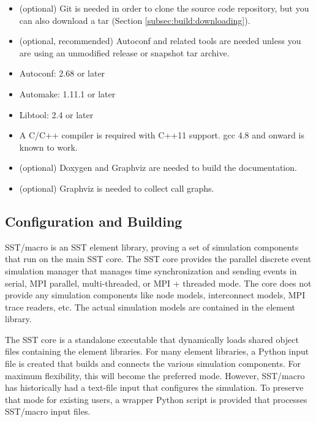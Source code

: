 \begin{itemize}
\item (optional) Git is needed in order to clone the source code repository, but you can also download a tar (Section \ref{subsec:build:downloading}).
\item (optional, recommended) Autoconf and related tools are needed unless you are using an unmodified release or snapshot tar archive.
\item Autoconf: 2.68 or later 
\item Automake: 1.11.1 or later 
\item Libtool: 2.4 or later 
\item A C/C++ compiler is required with C++11 support.  gcc 4.8 and onward is known to work. 
\item (optional) Doxygen and Graphviz are needed to build the documentation.
\item (optional) Graphviz is needed to collect call graphs.
\end{itemize}

\subsection{Configuration and Building}
\label{subsec:build:configure}

SST/macro is an SST element library, proving a set of simulation components that run on the main SST core.  The SST core provides the parallel discrete event simulation manager that manages time synchronization and sending events in serial, MPI parallel, multi-threaded, or MPI + threaded mode.  The core does not provide any simulation components like node models, interconnect models, MPI trace readers, etc.  The actual simulation models are contained in the element library.  

The SST core is a standalone executable that dynamically loads shared object files containing the element libraries.  For many element libraries, a Python input file is created that builds and connects the various simulation components.  For maximum flexibility, this will become the preferred mode.  However, SST/macro has historically had a text-file input  that configures the simulation.  To preserve that mode for existing users, a wrapper Python script is provided that processes SST/macro input files.  

